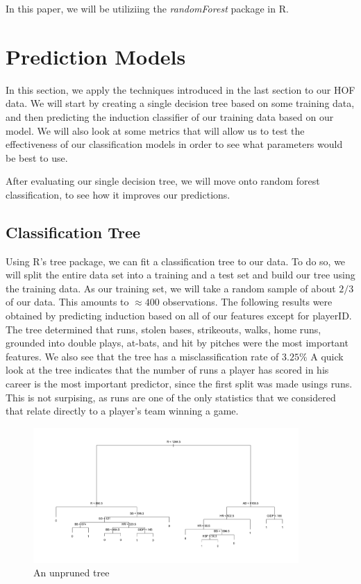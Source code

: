 \documentclass[preprint,12pt]{elsarticle}
\begin{document}
In this paper, we will be utiliziing the \textit{randomForest} package in R. 

\section{Prediction Models}

In this section, we apply the techniques introduced in the last section to our HOF data. We will start by creating a single decision tree based on some training data, and then predicting the induction classifier of our training data based on our model. We will also look at some metrics that will allow us to test the effectiveness of our classification models in order to see what parameters would be best to use. 

After evaluating our single decision tree, we will move onto random forest classification, to see how it improves our predictions. 

\subsection{Classification Tree}
Using R's tree package, we can fit a classification tree to our data. To do so, we will split the entire data set into a training and a test set and build our tree using the training data. As our training set, we will take a random sample of about $2/3$ of our data. This amounts to $\approx 400$ observations.
The following results were obtained by predicting induction based on all of our features except for playerID. The tree determined that runs, stolen bases, strikeouts, walks, home runs, grounded into double plays, at-bats, and hit by pitches were the most important features. We also see that the tree has a misclassification rate of $3.25\%$ A quick look at the tree indicates that the number of runs a player has scored in his career is the most important predictor, since the first split was made usings runs. This is not surpising, as runs are one of the only statistics that we considered that relate directly to a player's team winning a game. 
\bigskip

\begin{figure}[h1]
	\centering
	\includegraphics[width=0.9\textwidth]{MachineLearnTree}
	\caption{An unpruned tree}
\end{figure}
\end{document}
